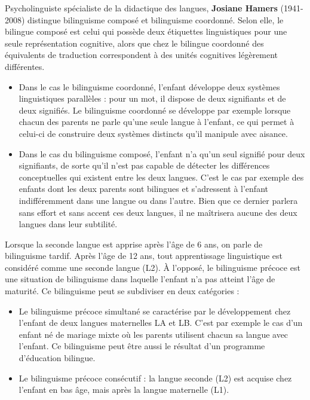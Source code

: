 Psycholinguiste spécialiste de la didactique des langues, \textbf{Josiane Hamers} (1941-2008) distingue bilinguisme composé et bilinguisme coordonné. Selon elle, le bilingue composé est celui qui possède deux étiquettes linguistiques pour une seule représentation cognitive, alors que chez le bilingue coordonné des équivalents de traduction correspondent à des unités cognitives légèrement différentes.

\begin{itemize}
\item Dans le cas le bilinguisme coordonné, l’enfant développe deux systèmes linguistiques parallèles : pour un mot, il dispose de deux signifiants et de deux signifiés. Le bilinguisme coordonné se développe par exemple lorsque chacun des parents ne parle qu’une seule langue à l’enfant, ce qui permet à celui-ci de construire deux systèmes distincts qu’il manipule avec aisance.
\item Dans le cas du bilinguisme composé, l’enfant n’a qu’un seul signifié pour deux signifiants, de sorte qu’il n’est pas capable de détecter les différences conceptuelles qui existent entre les deux langues. C’est le cas par exemple des enfants dont les deux parents sont bilingues et s’adressent à l’enfant indifféremment dans une langue ou dans l’autre. Bien que ce dernier parlera sans effort et sans accent ces deux langues, il ne maîtrisera aucune des deux langues dans leur subtilité.
\end{itemize}

Lorsque la seconde langue est apprise après l’âge de 6 ans, on parle de bilinguisme tardif. Après l’âge de 12 ans, tout apprentissage linguistique est considéré comme une seconde langue (L2). À l’opposé, le bilinguisme précoce est une situation de bilinguisme dans laquelle l’enfant n’a pas atteint l’âge de maturité. Ce bilinguisme peut se subdiviser en deux catégories :
\begin{itemize}
\item Le bilinguisme précoce simultané se caractérise par le développement chez l’enfant de deux langues maternelles LA et LB. C’est par exemple le cas d’un enfant né de mariage mixte où les parents utilisent chacun sa langue avec l’enfant. Ce bilinguisme peut être aussi le résultat d’un programme d’éducation bilingue.
\item Le bilinguisme précoce consécutif : la langue seconde (L2) est acquise chez l’enfant en bas âge, mais après la langue maternelle (L1).
\end{itemize}

